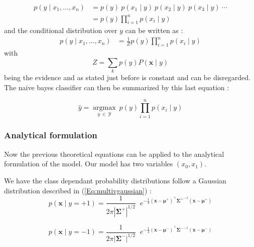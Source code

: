 \documentclass{article}
\begin{document}
\begin{equation}
\begin{aligned}p(y\mid x_{1},\dots ,x_{n})&= p(y)\ p(x_{1}\mid y)\ p(x_{2}\mid y)\ p(x_{3}\mid y)\ \cdots \\
&=p(y)\prod _{i=1}^{n}p(x_{i}\mid y)\,
\end{aligned}
\label{Eq:probaposteriori}
\end{equation}
\noindent 
and the conditional distribution over $y$ can be written as :
\begin{equation}
\begin{aligned}p(y\mid x_{1},\dots ,x_{n})&=  \frac{1}{Z} p(y)\prod _{i=1}^{n}p(x_{i}\mid y)
\end{aligned}
\end{equation}
with 
\begin{equation*}
Z = \sum_{k} p(y) P(\boldsymbol{x} \mid y)
\end{equation*}
being the evidence and as stated just before is constant and can be disregarded. The naive bayes classifier can then be summarized by this last equation :

\begin{equation}
    \hat {y}={\underset {y\ \in\  \mathcal{Y}}{\operatorname {argmax} }}\ p(y)\prod _{i=1}^{n}p(x_{i}\mid y)
    \label{Eq:bayesmodel}
\end{equation}



\subsubsection*{Analytical formulation}


\noindent
Now the previous theoretical equations can be applied to the analytical formulation of the model.
Our model has two variables $(x_0,x_1)$.

We have the class dependant probability distributions follow a Gaussian distribution described in (\ref{Eq:multivgaussian}) :
\begin{equation}
    p(\boldsymbol{x} \mid y = + 1)={\frac {1}{2\pi \left|{\boldsymbol {\Sigma^+ }}\right|^{1/2}}}\;\;e^{-{\frac {1}{2}}\left({\boldsymbol {x}}-{\boldsymbol {\mu^+ }}\right)^{\top }{\boldsymbol {\Sigma^+ }}^{-1}\left({\boldsymbol {x}}-{\boldsymbol {\mu^+ }}\right)}
\end{equation}

\begin{equation}
    p(\boldsymbol{x} \mid y = -1)={\frac {1}{2\pi \left|{\boldsymbol {\Sigma^- }}\right|^{1/2}}}\;\;e^{-{\frac {1}{2}}\left({\boldsymbol {x}}-{\boldsymbol {\mu^- }}\right)^{\top }{\boldsymbol {\Sigma^- }}^{-1}\left({\boldsymbol {x}}-{\boldsymbol {\mu^- }}\right)}
\end{equation}
\end{document}
